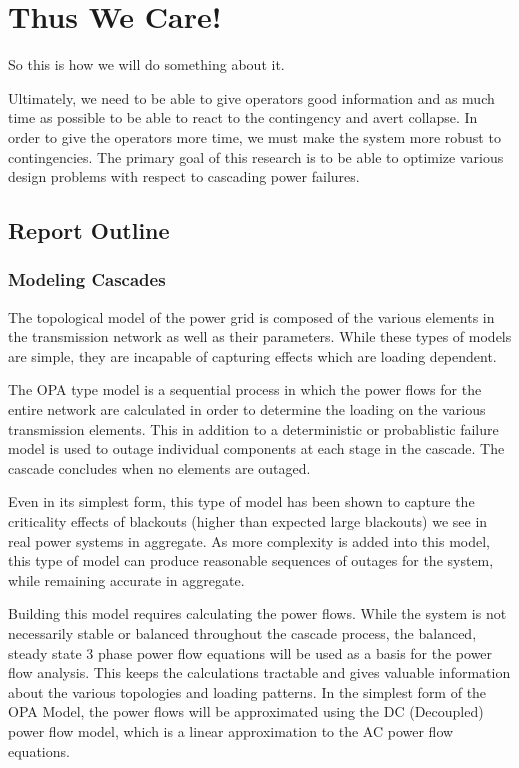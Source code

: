 \section{Thus We Care!}
So this is how we will do something about it.

Ultimately, we need to be able to give operators good information and as much time as possible to be able to react to the contingency and avert collapse.  In order to give the operators more time, we must make the system more robust to contingencies.  The primary goal of this research is to be able to optimize various design problems with respect to cascading power failures. 

\subsection{Report Outline}

\subsubsection{Modeling Cascades}
The topological model of the power grid is composed of the various elements in the transmission network as well as their parameters.  While these types of models are simple, they are incapable of capturing effects which are loading dependent. 

The OPA type model is a sequential process in which the power flows for the entire network are calculated in order to determine the loading on the various transmission elements.  This in addition to a deterministic or probablistic failure model is used to outage individual components at each stage in the cascade.  The cascade concludes when no elements are outaged.

Even in its simplest form, this type of model has been shown to capture the criticality effects of blackouts (higher than expected large blackouts) we see in real power systems in aggregate.  As more complexity is added into this model, this type of model can produce reasonable sequences of outages for the system, while remaining accurate in aggregate. 

Building this model requires calculating the power flows.  While the system is not necessarily stable or balanced throughout the cascade process, the balanced, steady state 3 phase power flow equations will be used as a basis for the power flow analysis.  This keeps the calculations tractable and gives valuable information about the various topologies and loading patterns.  In the simplest form of the OPA Model, the power flows will be approximated using the DC (Decoupled) power flow model, which is a linear approximation to the AC power flow equations.

